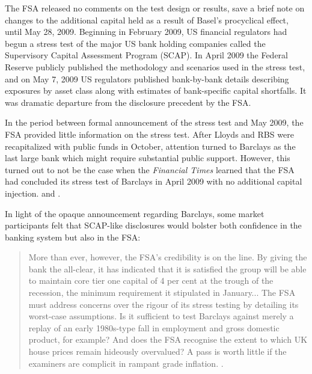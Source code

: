 The FSA released no comments on the test design or results, save a brief note on changes to the additional capital held as a result of Basel's procyclical effect, until May 28, 2009. Beginning in February 2009, US financial regulators had begun a stress test of the major US bank holding companies called the Supervisory Capital Assessment Program (SCAP). In April 2009 the Federal Reserve publicly published the methodology and scenarios used in the stress test, and on May 7, 2009 US regulators published bank-by-bank details describing exposures by asset class along with estimates of bank-specific capital shortfalls. It was dramatic departure from the disclosure precedent by the FSA.

In the period between formal announcement of the stress test and May 2009, the FSA provided little information on the stress test. After Lloyds and RBS were recapitalized with public funds in October, attention turned to Barclays as the last large bank which might require substantial public support. However, this turned out to not be the case when the \textit{Financial Times} learned that the FSA had concluded its stress test of Barclays in April 2009 with no additional capital injection. \citep{Barclays1} and \citep{Lex}.

In light of the opaque announcement regarding Barclays, some market participants felt that SCAP-like disclosures would bolster both confidence in the banking system but also in the FSA:

\begin{quote}
  More than ever, however, the FSA’s credibility is on the line. By giving the bank the all-clear, it has indicated that it is satisfied the group will be able to maintain core tier one capital of 4 per cent at the trough of the recession, the minimum requirement it stipulated in January... The FSA must address concerns over the rigour of its stress testing by detailing its worst-case assumptions. Is it sufficient to test Barclays against merely a replay of an early 1980s-type fall in employment and gross domestic product, for example? And does the FSA recognise the extent to which UK house prices remain hideously overvalued? A pass is worth little if the examiners are complicit in rampant grade inflation. \citep{Lex}.
\end{quote}

